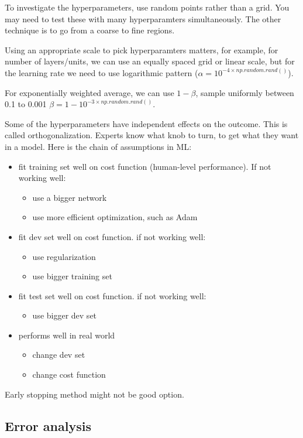 \documentclass[12pt]{report}
\begin{document}
To investigate the hyperparameters, use random points rather than a grid. You may need to test these with many hyperparamters simultaneously. The other technique is to go from a coarse to fine regions.

Using an appropriate scale to pick hyperparamters matters, for example, for number of layers/units, we can use an equally spaced grid or linear scale, but for the learning rate we need to use logarithmic pattern ($\alpha = 10^{-4 \times np.random.rand()}$).

For exponentially weighted average, we can use $1-\beta$, sample uniformly between 0.1 to 0.001 $\beta = 1-10^{-3 \times np.random.rand()}$.

Some of the hyperparameters have independent effects on the outcome. This is called orthogonalization. Experts know what knob to turn, to get what they want in a model. Here is the chain of assumptions in ML:
\begin{itemize}
  \item fit training set well on cost function (human-level performance). If not working well:
  \begin{itemize}
    \item use a bigger network
    \item use more efficient optimization, such as Adam
  \end{itemize}
  \item fit dev set well on cost function. if not working well:
  \begin{itemize}
    \item use regularization
    \item use bigger training set
  \end{itemize}
  \item fit test set well on cost function. if not working well:
  \begin{itemize}
    \item use bigger dev set
  \end{itemize}
  \item performs well in real world
  \begin{itemize}
    \item change dev set
    \item change cost function
  \end{itemize}
\end{itemize}

Early stopping method might not be good option.

\subsection{Error analysis}
\end{document}
